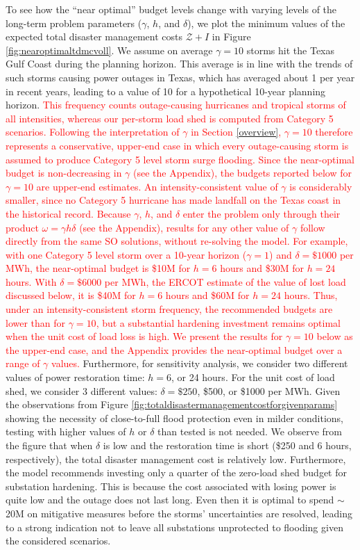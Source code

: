 \documentclass[authoryear,preprint,review,12pt]{elsarticle}\usepackage{amssymb}
\begin{document}
To see how the ``near optimal'' budget levels change with varying levels of the long-term problem parameters ($\gamma$, $h$, and $\delta$), we plot the minimum values of the expected total disaster management costs $\mathcal{Z}+I$ in Figure \ref{fig:nearoptimaltdmcvoll}. We assume on average $\gamma=10$ storms hit the Texas Gulf Coast during the planning horizon. This average is in line with the trends of such storms causing power outages in Texas, which has averaged about 1 per year in recent years, leading to a value of 10 for a hypothetical 10-year planning horizon. \textcolor{red}{This frequency counts outage-causing hurricanes and tropical storms of all intensities, whereas our per-storm load shed is computed from Category 5 scenarios. Following the interpretation of $\gamma$ in Section \ref{overview}, $\gamma = 10$ therefore represents a conservative, upper-end case in which every outage-causing storm is assumed to produce Category 5 level storm surge flooding. Since the near-optimal budget is non-decreasing in $\gamma$ (see the Appendix), the budgets reported below for $\gamma = 10$ are upper-end estimates. An intensity-consistent value of $\gamma$ is considerably smaller, since no Category 5 hurricane has made landfall on the Texas coast in the historical record. Because $\gamma$, $h$, and $\delta$ enter the problem only through their product $\omega = \gamma h \delta$ (see the Appendix), results for any other value of $\gamma$ follow directly from the same SO solutions, without re-solving the model. For example, with one Category 5 level storm over a 10-year horizon ($\gamma = 1$) and $\delta = \$1000$ per MWh, the near-optimal budget is \$10M for $h = 6$ hours and \$30M for $h = 24$ hours. With $\delta = \$6000$ per MWh, the ERCOT estimate of the value of lost load discussed below, it is \$40M for $h = 6$ hours and \$60M for $h = 24$ hours. Thus, under an intensity-consistent storm frequency, the recommended budgets are lower than for $\gamma = 10$, but a substantial hardening investment remains optimal when the unit cost of load loss is high. We present the results for $\gamma = 10$ below as the upper-end case, and the Appendix provides the near-optimal budget over a range of $\gamma$ values.} Furthermore, for sensitivity analysis, we consider two different values of power restoration time: $h=6$, or 24 hours. For the unit cost of load shed, we consider 3 different values: $\delta = \$250$, \$500, or \$1000 per MWh. Given the observations from Figure \ref{fig:totaldisastermanagementcostforgivenparams} showing the necessity of close-to-full flood protection even in milder conditions, testing with higher values of $h$ or $\delta$ than tested is not needed. We observe from the figure that when $\delta$ is low and the restoration time is short (\$250 and 6 hours, respectively), the total disaster management cost is relatively low. Furthermore, the model recommends investing only a quarter of the zero-load shed budget for substation hardening. This is because the cost associated with losing power is quite low and the outage does not last long. Even then it is optimal to spend $\sim$20M on mitigative measures before the storms' uncertainties are resolved, leading to a strong indication not to leave all substations unprotected to flooding given the considered scenarios. 
\end{document}
